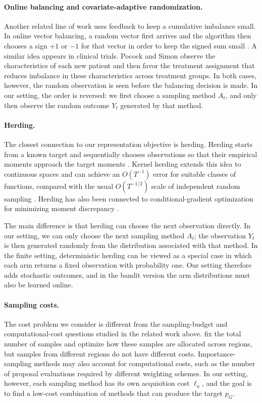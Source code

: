 \documentclass[twoside]{article}
\begin{document}
\paragraph{Online balancing and covariate-adaptive randomization.}
Another related line of work uses feedback to keep a cumulative imbalance
small. In online vector balancing, a random vector first arrives and the
algorithm then chooses a sign \(+1\) or \(-1\) for that vector in order to
keep the signed sum small
\citep{bansal2020online,bansal2021discrepancy}. A similar idea appears in
clinical trials. Pocock and Simon \citep{pocock1975sequential} observe the
characteristics of each new patient and then favor the treatment assignment
that reduces imbalance in these characteristics across treatment groups. In
both cases, however, the random observation is seen before the balancing
decision is made. In our setting, the order is reversed: we first choose a
sampling method \(A_t\), and only then observe the random outcome \(Y_t\)
generated by that method.
\paragraph{Herding.}
The closest connection to our representation objective is herding. Herding
starts from a known target and sequentially chooses observations so that their
empirical moments approach the target moments \citep{welling2009herding}. Kernel
herding extends this idea to continuous spaces and can achieve an
\(O(T^{-1})\) error for suitable classes of functions, compared with the usual
\(O(T^{-1/2})\) scale of independent random sampling
\citep{chen2010supersamples}. Herding has also been connected to
conditional-gradient optimization for minimizing moment discrepancy
\citep{bach2012equivalence}.

The main difference is that herding can choose the next observation directly.
In our setting, we can only choose the next sampling method \(A_t\); the
observation \(Y_t\) is then generated randomly from the distribution associated
with that method. In the finite setting, deterministic herding can be viewed as
a special case in which each arm returns a fixed observation with probability
one. Our setting therefore adds stochastic outcomes, and in the bandit version
the arm distributions must also be learned online.
\paragraph{Sampling costs.}
The cost problem we consider is different from the sampling-budget and
computational-cost questions studied in the related work above. \cite{carpentier2012adaptive} fix the total number of samples and optimize how these samples are
allocated across regions, but samples from different regions do not have
different costs. Importance-sampling methods may also account for computational
costs, such as the number of proposal evaluations required by different
weighting schemes. In our setting, however, each sampling method has its own
acquisition cost \(\ell_a\), and the goal is to find a low-cost combination of
methods that can produce the target \(p_G\).
\end{document}
